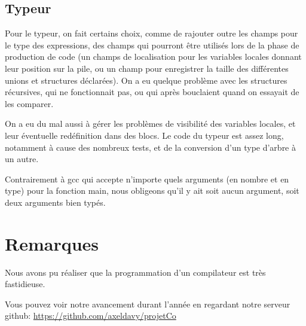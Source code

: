 \documentclass[a4paper]{article}
\begin{document}
\subsection{Typeur}

Pour le typeur, on fait certains choix, comme de rajouter outre les champs
pour le type des expressions, des champs qui pourront être utilisés lors de
la phase de production de code (un champs de localisation pour les
variables locales donnant leur position sur la pile, ou un champ pour
enregistrer la taille des différentes unions et structures déclarées). On a
eu quelque problème avec les structures récursives, qui ne fonctionnait
pas, ou qui après bouclaient quand on essayait de les comparer. 

On a eu du mal aussi à gérer les problèmes de visibilité des variables
locales, et leur éventuelle redéfinition dans des blocs.
Le code du typeur est assez long, notamment à cause des nombreux tests, et
de la conversion d'un type d'arbre à un autre.

Contrairement à gcc qui accepte n'importe quels arguments (en nombre et en type) pour la fonction
main, nous obligeons qu'il y ait soit aucun argument, soit deux arguments
bien typés.

\section{Remarques}
Nous avons pu réaliser que la programmation d'un compilateur est très
fastidieuse. 


Vous pouvez voir notre avancement durant l'année en regardant notre serveur
github: 
\url {https://github.com/axeldavy/projetCo}
\end{document}
